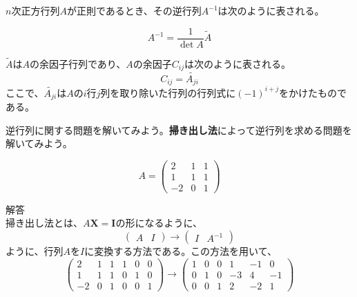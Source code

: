 \documentclass{jlreq}
\begin{document}
\begin{theorembox}[逆行列と余因子行列]
  $n$次正方行列$A$が正則であるとき、その逆行列$A^{-1}$は次のように表される。
  
  \begin{equation*}
    A^{-1} = \frac{1}{\det A} \tilde{A}
  \end{equation*}

  $\tilde{A}$は$A$の余因子行列であり、$A$の余因子$C_{ij}$は次のように表される。
  \begin{equation*}
    C_{ij} = \tilde{A_{ji}}
  \end{equation*}
  ここで、$\tilde{A_{ji}}$は$A$の$i$行$j$列を取り除いた行列の行列式に$(-1)^{i+j}$をかけたものである。
\end{theorembox}

逆行列に関する問題を解いてみよう。\textbf{掃き出し法}によって逆行列を求める問題を解いてみよう。

\begin{problem}
  \begin{equation*}
    A = \begin{pmatrix}
      2 & 1 & 1 \\
      1 & 1 & 1 \\
      -2 & 0 & 1
    \end{pmatrix}
  \end{equation*}
  \dotfill

  解答 \\
  掃き出し法とは、$A \boldsymbol{X} = \boldsymbol{I}$の形になるように、
  \begin{equation*}
    \begin{pmatrix}
      A & I
    \end{pmatrix} \to \begin{pmatrix}
      I & A^{-1}
    \end{pmatrix}
  \end{equation*}
  ように、行列$A$を$I$に変換する方法である。この方法を用いて、
  \begin{equation*}
    \begin{pmatrix}
      2 & 1 & 1 & 1 & 0 & 0 \\
      1 & 1 & 1 & 0 & 1 & 0 \\
      -2 & 0 & 1 & 0 & 0 & 1
    \end{pmatrix} \to \begin{pmatrix}
      1 & 0 & 0 & 1 & -1 & 0 \\
      0 & 1 & 0 & -3 & 4 & -1 \\
      0 & 0 & 1 & 2 & -2 & 1
    \end{pmatrix}
  \end{equation*}
\end{problem}
\end{document}
